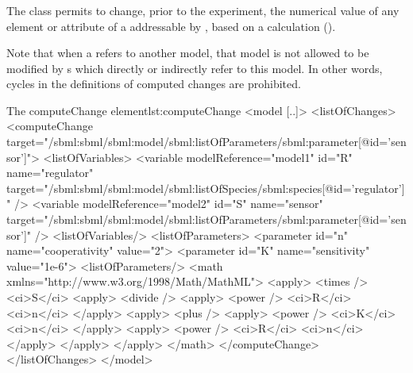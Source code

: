 \subsubsection{}
\label{class:computeChange}
The  class permits to change, prior to the experiment, the numerical value of any element or attribute of a \Model addressable by , based on a calculation ().  


Note that when a  refers to another model, that model is not allowed to be modified by s which directly or indirectly refer to this model. In other words, cycles in the definitions of computed changes are prohibited.


\begin{myXmlLst}{The computeChange element}{lst:computeChange}
<model [..]>
	<listOfChanges>
	<computeChange target="/sbml:sbml/sbml:model/sbml:listOfParameters/sbml:parameter[@id='sensor']">
		<listOfVariables>
			<variable modelReference="model1" id="R" name="regulator" 
				target="/sbml:sbml/sbml:model/sbml:listOfSpecies/sbml:species[@id='regulator']" />
			<variable modelReference="model2" id="S" name="sensor"
				target="/sbml:sbml/sbml:model/sbml:listOfParameters/sbml:parameter[@id='sensor']" />
		<listOfVariables/>
		<listOfParameters>
			<parameter id="n" name="cooperativity" value="2">
			<parameter id="K" name="sensitivity" value="1e-6">
		<listOfParameters/>
		<math  xmlns="http://www.w3.org/1998/Math/MathML">
        <apply>
          <times />
          <ci>S</ci>
          <apply>
            <divide />
            <apply>
              <power />
              <ci>R</ci>
              <ci>n</ci>
            </apply>
            <apply>
              <plus />
              <apply>
                <power />
                <ci>K</ci>
                <ci>n</ci>
              </apply>
              <apply>
                <power />
                <ci>R</ci>
                <ci>n</ci>
              </apply>
            </apply> 
		</apply>
		</math>
	</computeChange>
	</listOfChanges>
</model>
\end{myXmlLst}

